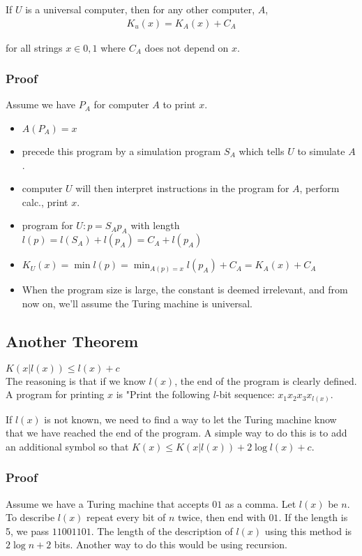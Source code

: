 \documentclass[11pt]{article}
\theoremstyle{definition}
\begin{document}
 If $U$ is a universal computer, then for any other computer, $A$, 
\begin{align*}
	K_u(x) = K_A(x) + C_A
\end{align*}

for all strings $x \in {0, 1}$ where $C_A$ does not depend on $x$.

\subsubsection{Proof}

Assume we have $P_A$ for computer $A$ to print $x$.
\begin{itemize}
	\item $A(P_A) = x$
	\item precede this program by a simulation program $S_A$ which tells $U$ to simulate $A$.
	\item computer $U$ will then interpret instructions in the program for $A$, perform calc., print $x$.
	\item program for $U: p=S_Ap_A$ with length $l(p)=l(S_A)+l(p_A)=C_A+l(p_A)$
	\item $K_U(x)=\min{l(p)} = \min_{A(p)=x}{l(p_A)+C_A}=K_A(x)+C_A$
	\item When the program size is large, the constant is deemed irrelevant, and from now on, we'll assume the Turing machine is universal.
\end{itemize}

\subsection{Another Theorem}

\theorem{} $K(x|l(x)) \leq l(x) + c$ \\

The reasoning is that if we know $l(x)$, the end of the program is clearly defined. A program for printing $x$ is "Print the following $l$-bit sequence: $x_1x_2x_3x_{l(x)}$.

If $l(x)$ is not known, we need to find a way to let the Turing machine know that we have reached the end of the program. A simple way to do this is to add an additional symbol so that $K(x) \leq K(x|l(x))+2\log{l(x)}+c$.

\subsubsection{Proof}

Assume we have a Turing machine that accepts $01$ as a comma. Let $l(x)$ be $n$. To describe $l(x)$ repeat every bit of $n$ twice, then end with $01$. If the length is 5, we pass $11001101$. The length of the description of $l(x)$ using this method is $2\log{n}+2$ bits. Another way to do this would be using recursion.
\end{document}
